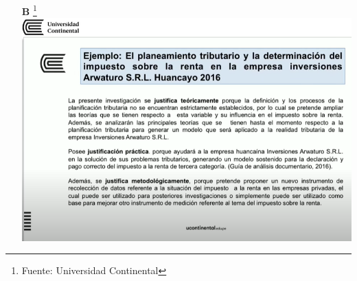 {\begin{itemize}
    
    \item[\textbf{B}] \footnote{Fuente: Universidad Continental}
   \includegraphics[scale=0.8]{img/ejempl2.png}
    
\end{itemize}
}

